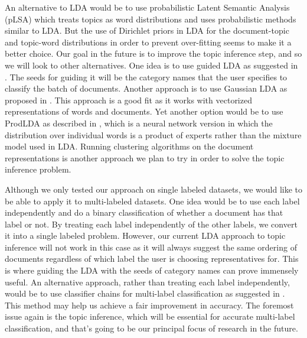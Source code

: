 \documentclass{article} %
\begin{document}
An alternative to LDA would be to use probabilistic Latent Semantic Analysis (pLSA) which treats topics as word distributions and uses probabilistic methods similar to LDA. But the use of Dirichlet priors in LDA for the document-topic and topic-word distributions in order to prevent over-fitting seems to make it a better choice. Our goal in the future is to improve the topic inference step, and so we will look to other alternatives. One idea is to use guided LDA as suggested in \citep{conf/eacl/JagarlamudiDU12}.  The seeds for guiding it will be the category names that the user specifies to classify the batch of documents.  Another approach is to use Gaussian LDA as proposed in \citep{conf/acl/DasZD15}. This approach is a good fit as it works with vectorized representations of words and documents. Yet another option would be to use ProdLDA as described in \citep{2017arXiv170301488S}, which is a neural network version in which the distribution over individual words is a product of experts rather than the mixture model used in LDA. Running clustering algorithms on the document representations is another approach we plan to try in order to solve the topic inference problem.

Although we only tested our approach on single labeled datasets, we would like to be able to apply it to multi-labeled datasets. One idea would be to use each label independently and do a binary classification of whether a document has that label or not. By treating each label independently of the other labels, we convert it into a single labeled problem. However, our current LDA approach to topic inference will not work in this case as it will always suggest the same ordering of documents regardless of which label the user is choosing representatives for. This is where guiding the LDA with the seeds of category names can prove immensely useful. An alternative approach, rather than treating each label independently, would be to use classifier chains for multi-label classification as suggested in \citep{Read2009}. This method may help us achieve a fair improvement in accuracy. The foremost issue again is the topic inference, which will be essential for accurate multi-label classification, and that's going to be our principal focus of research in the future.



\end{document}
